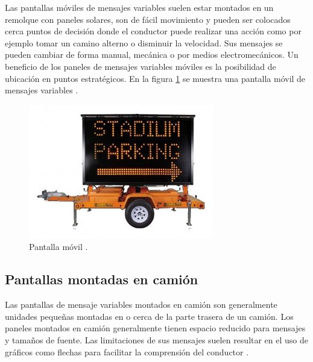 Las pantallas móviles de mensajes variables suelen estar montados en un remolque con paneles solares, son de fácil movimiento y pueden ser colocados cerca puntos de decisión donde el conductor puede realizar una acción como por ejemplo tomar un camino alterno o disminuir la velocidad. Sus mensajes se pueden cambiar de forma manual, mecánica o por medios electromecánicos. Un beneficio de los paneles de mensajes variables móviles es la posibilidad de ubicación en puntos estratégicos. En la figura \ref{fig:vmsm} se muestra una pantalla móvil de mensajes variables \citep{VMSTYPES}.

\begin{figure}[htpb]
	\centering
	\includegraphics[width=.7\textwidth]{../Figures/vmsmovil.jpg} 
	\caption{Pantalla móvil \protect\footnotemark.}
	\label{fig:vmsm}
\end{figure}



\subsection{Pantallas montadas en camión}

Las pantallas de mensaje variables montados en camión son generalmente unidades pequeñas montadas en o cerca de la parte trasera de un camión. Los paneles montados en camión generalmente tienen espacio reducido para mensajes y tamaños de fuente. Las limitaciones de sus mensajes suelen resultar en el uso de gráficos como flechas para facilitar la comprensión del conductor \citep{VMSTYPES}.

